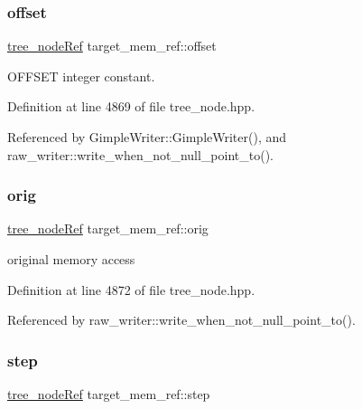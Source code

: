 \mbox{\label{structtarget__mem__ref_a9c343bbc08697878aede0e01284e127a}} 
\subsubsection{\texorpdfstring{offset}{offset}}
{\footnotesize\ttfamily \hyperlink{tree__node_8hpp_a6ee377554d1c4871ad66a337eaa67fd5}{tree\+\_\+node\+Ref} target\+\_\+mem\+\_\+ref\+::offset}



O\+F\+F\+S\+ET integer constant. 



Definition at line 4869 of file tree\+\_\+node.\+hpp.



Referenced by Gimple\+Writer\+::\+Gimple\+Writer(), and raw\+\_\+writer\+::write\+\_\+when\+\_\+not\+\_\+null\+\_\+point\+\_\+to().

\mbox{\label{structtarget__mem__ref_ad7127ce0c61cf77d8bbca967976ae05f}} 
\subsubsection{\texorpdfstring{orig}{orig}}
{\footnotesize\ttfamily \hyperlink{tree__node_8hpp_a6ee377554d1c4871ad66a337eaa67fd5}{tree\+\_\+node\+Ref} target\+\_\+mem\+\_\+ref\+::orig}



original memory access 



Definition at line 4872 of file tree\+\_\+node.\+hpp.



Referenced by raw\+\_\+writer\+::write\+\_\+when\+\_\+not\+\_\+null\+\_\+point\+\_\+to().

\mbox{\label{structtarget__mem__ref_a604fd352b54fdea34609be7f9da5afaf}} 
\subsubsection{\texorpdfstring{step}{step}}
{\footnotesize\ttfamily \hyperlink{tree__node_8hpp_a6ee377554d1c4871ad66a337eaa67fd5}{tree\+\_\+node\+Ref} target\+\_\+mem\+\_\+ref\+::step}



